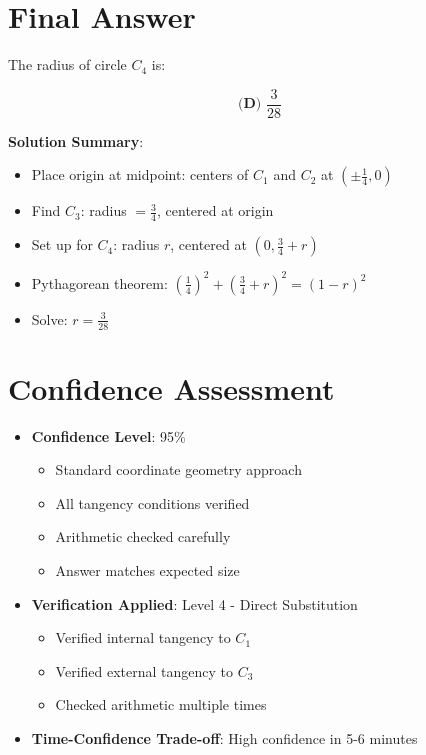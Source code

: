 \documentclass[11pt]{article}
\begin{document}
\section*{Final Answer}

The radius of circle $C_4$ is:

\[\boxed{\textbf{(D) } \frac{3}{28}}\]

\textbf{Solution Summary}:
\begin{itemize}
    \item Place origin at midpoint: centers of $C_1$ and $C_2$ at $(\pm\frac{1}{4}, 0)$
    \item Find $C_3$: radius $= \frac{3}{4}$, centered at origin
    \item Set up for $C_4$: radius $r$, centered at $(0, \frac{3}{4} + r)$
    \item Pythagorean theorem: $(\frac{1}{4})^2 + (\frac{3}{4} + r)^2 = (1-r)^2$
    \item Solve: $r = \frac{3}{28}$
\end{itemize}

\section*{Confidence Assessment}
\begin{itemize}[leftmargin=*]
    \item \textbf{Confidence Level}: 95\%
    \begin{itemize}
        \item Standard coordinate geometry approach
        \item All tangency conditions verified
        \item Arithmetic checked carefully
        \item Answer matches expected size
    \end{itemize}
    \item \textbf{Verification Applied}: Level 4 - Direct Substitution
    \begin{itemize}
        \item Verified internal tangency to $C_1$
        \item Verified external tangency to $C_3$
        \item Checked arithmetic multiple times
    \end{itemize}
    \item \textbf{Time-Confidence Trade-off}: High confidence in 5-6 minutes
\end{itemize}
\end{document}
